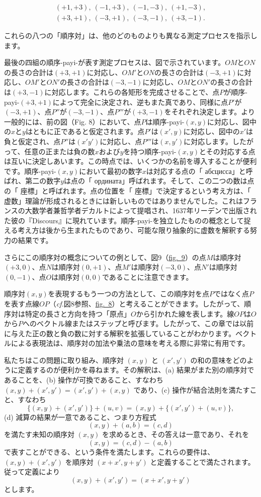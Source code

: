 \documentclass[a4paper,11pt,openany]{ltjsbook}
\providecommand{\Chg}[2]{#2}
\providecommand{\Fig}[2][Fig.]{\hyperref[fig:#2]{#1~#2}}
\providecommand{\cf}{\emph{cf.}}
\begin{document}
\begin{gather*}
(+1, +3),\ (-1, +3),\ (-1, -3),\ (+1, -3), \\
(+3, +1),\ (-3, +1),\ (-3, -1),\ (+3, -1).
\end{gather*}

これらの八つの「順序対」は、他のどのものよりも異なる測定プロセスを指示します。

最後の四組の順序-payi-が表す測定プロセスは、図で示されています。$OM$と$ON$の長さの合計は$(+3, +1)$に対応し、$OM'$と$ON$の長さの合計は$(-3, +1)$に対応し、$OM'$と$ON'$の長さの合計は$(-3, -1)$に対応し、$OM$と$ON'$の長さの合計は$(+3, -1)$に対応します。これらの各矩形を完成させることで、点$P$が順序-payi-$(+3, +1)$によって完全に決定され、逆もまた真であり、同様に点$P'$が$(-3, +1)$、点$P''$が$(-3, -1)$、点$P'''$が$(+3, -1)$をそれぞれ決定します。より一般的には、前の図（Fig. 8）において、点$P$は順序-payi-$(x, y)$に対応し、図中の$x$と$y$はともに正であると仮定されます。点$P'$は$(x', y)$に対応し、図中の$x'$は負と仮定され、点$P''$は$(x' y')$に対応し、点$P'''$は$(x, y')$に対応します。したがって、任意の正または負の数$x$および$y$を持つ順序-payi-$(x, y)$とその対応する点は互いに決定しあいます。この時点では、いくつかの名前を導入することが便利です。順序-payi-$(x, y)$において最初の数字$x$は対応する点の「 абсцисса」と呼ばれ、第二の数字$y$は点の「 ордината」呼ばれます。そして、この二つの数は点の「 座標」と呼ばれます。点の位置を「 座標」で決定するという考え方は、「 虚数」理論が形成されるときには新しいものではありませんでした。これはフランスの大数学者兼哲学者デカルトによって提唱され、1637年リーデンで出版された彼の『Discours』に現れています。順序-payi-を独立したものの概念として捉える考え方は後から生まれたものであり、可能な限り抽象的に虚数を解釈する努力の結果です。

さらにこの順序対の概念についての例として、図9（\Fig[fig.]{9}）の点$M$は順序対$(+3, 0)$、点$N$は順序対$(0, +1)$、点$M'$は順序対$(-3, 0)$、点$N'$は順序対$(0, -1)$、点$O$は順序対$(0, 0)$であることに注意できます。

順序対$(x, y)$を表現するもう一つの方法として、この順序対を点$P$ではなく点$P$を表す点線$OP$（\Chg{cf.}{\cf}図8参照、\Fig[fig.]{8}）と考えることができます。したがって、順序対は特定の長さと方向を持つ「原点」$O$から引かれた線を表します。線$OP$は$O$から$P$へのベクトル線またはステップと呼びます。したがって、この章では以前に与えた正の数と負の数に対する解釈を拡張していることがわかります。ベクトルによる表現法は、順序対の加法や乗法の意味を考える際に非常に有用です。

私たちはこの問題に取り組み、順序対 $(x, y)$ と $(x', y')$ の和の意味をどのように定義するのが便利かを尋ねます。その解釈は、(a) 結果がまた別の順序対であることを、(b) 操作が可換であること、すなわち $(x, y) + (x', y') = (x', y') + (x, y)$ であり、(c) 操作が結合法則を満たすこと、すなわち
\[
\{(x, y) + (x', y')\} + (u, v) = (x, y) + \{(x', y') + (u, v)\},
\]
(d) 減算の結果が一意であること、つまり方程式
\[
(x, y) + (a, b) = (c, d)
\]
を満たす未知の順序対 $(x, y)$ を求めるとき、その答えは一意であり、それを
\[
(x, y) = (c, d) - (a, b)
\]
で表すことができる、という条件を満たします。これらの要件は、$(x, y) + (x', y')$ を順序対 $(x + x', y + y')$ と定義することで満たされます。従って定義により
\[
(x, y) + (x', y') = (x + x', y + y')
\]
とします。
\end{document}
